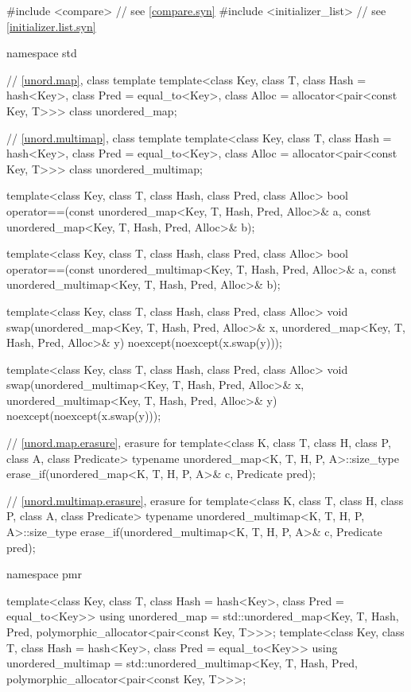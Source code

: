%
%
%
\begin{codeblock}
#include <compare>              // see \ref{compare.syn}
#include <initializer_list>     // see \ref{initializer.list.syn}

namespace std {
  // \ref{unord.map}, class template 
  template<class Key,
           class T,
           class Hash = hash<Key>,
           class Pred = equal_to<Key>,
           class Alloc = allocator<pair<const Key, T>>>
    class unordered_map;

  // \ref{unord.multimap}, class template 
  template<class Key,
           class T,
           class Hash = hash<Key>,
           class Pred = equal_to<Key>,
           class Alloc = allocator<pair<const Key, T>>>
    class unordered_multimap;

  template<class Key, class T, class Hash, class Pred, class Alloc>
    bool operator==(const unordered_map<Key, T, Hash, Pred, Alloc>& a,
                    const unordered_map<Key, T, Hash, Pred, Alloc>& b);

  template<class Key, class T, class Hash, class Pred, class Alloc>
    bool operator==(const unordered_multimap<Key, T, Hash, Pred, Alloc>& a,
                    const unordered_multimap<Key, T, Hash, Pred, Alloc>& b);

  template<class Key, class T, class Hash, class Pred, class Alloc>
    void swap(unordered_map<Key, T, Hash, Pred, Alloc>& x,
              unordered_map<Key, T, Hash, Pred, Alloc>& y)
      noexcept(noexcept(x.swap(y)));

  template<class Key, class T, class Hash, class Pred, class Alloc>
    void swap(unordered_multimap<Key, T, Hash, Pred, Alloc>& x,
              unordered_multimap<Key, T, Hash, Pred, Alloc>& y)
      noexcept(noexcept(x.swap(y)));

  // \ref{unord.map.erasure}, erasure for 
  template<class K, class T, class H, class P, class A, class Predicate>
    typename unordered_map<K, T, H, P, A>::size_type
      erase_if(unordered_map<K, T, H, P, A>& c, Predicate pred);

  // \ref{unord.multimap.erasure}, erasure for 
  template<class K, class T, class H, class P, class A, class Predicate>
    typename unordered_multimap<K, T, H, P, A>::size_type
      erase_if(unordered_multimap<K, T, H, P, A>& c, Predicate pred);

  namespace pmr {
    template<class Key,
             class T,
             class Hash = hash<Key>,
             class Pred = equal_to<Key>>
      using unordered_map =
        std::unordered_map<Key, T, Hash, Pred,
                           polymorphic_allocator<pair<const Key, T>>>;
    template<class Key,
             class T,
             class Hash = hash<Key>,
             class Pred = equal_to<Key>>
      using unordered_multimap =
        std::unordered_multimap<Key, T, Hash, Pred,
                                polymorphic_allocator<pair<const Key, T>>>;

  }
}
\end{codeblock}

